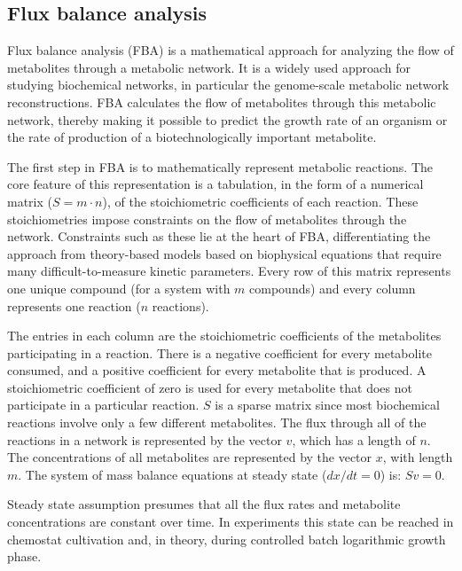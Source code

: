 \subsection{Flux balance analysis}

Flux balance analysis (FBA) is a mathematical approach for analyzing the flow of metabolites through a metabolic network.
It is a widely used approach for studying biochemical networks, in particular the genome-scale metabolic network reconstructions. 
FBA calculates the flow of metabolites through this metabolic network, thereby making it possible to predict the growth rate of an 
organism or the rate of production of a biotechnologically important metabolite. 
\cite{Orth2010}

The first step in FBA is to mathematically represent metabolic reactions. 
The core feature of this representation is a tabulation, in the form of a numerical matrix ($S = m\cdot n$), 
of the stoichiometric coefficients of each reaction. These stoichiometries impose 
constraints on the flow of metabolites through the network. Constraints such as these lie at the heart of 
FBA, differentiating the approach from theory-based models based on biophysical equations that require many difficult-to-measure 
kinetic parameters. Every row of this matrix represents one unique compound (for a system with $m$ compounds) and every column 
represents one reaction ($n$ reactions). 

The entries in each column are the stoichiometric coefficients 
of the metabolites participating in a reaction. There is a negative coefficient 
for every metabolite consumed, and a positive coefficient for every metabolite 
that is produced. A stoichiometric coefficient of zero is used for every 
metabolite that does not participate in a particular reaction. $S$ is a sparse 
matrix since most biochemical reactions involve only a few different metabolites. 
The flux through all of the reactions in a network is represented by the vector 
$v$, which has a length of $n$. The concentrations of all metabolites are represented
by the vector $x$, with length $m$. The system of mass balance equations at steady 
state ($dx/dt = 0$) is: $Sv = 0$. \cite{Orth2010}

Steady state assumption presumes that all the flux rates and metabolite concentrations are constant over time. In experiments this state can be
reached in chemostat cultivation and, in theory, during controlled batch logarithmic growth
phase. \cite{Kerkhoven2014} 

